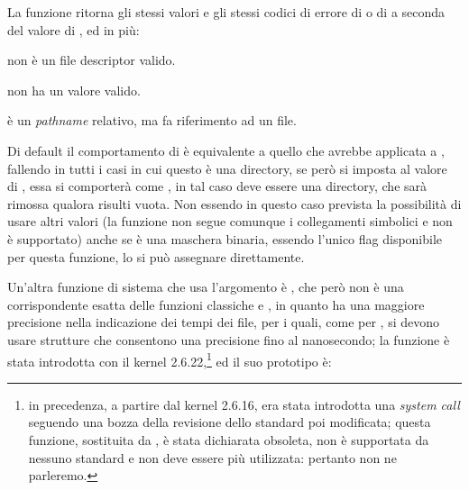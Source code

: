 \begin{funcproto}{
}

{La funzione ritorna gli stessi valori e gli stessi codici di errore di
   o di  a seconda del valore di , ed in
  più:
  \begin{errlist}
  \item[\errcode{EBADF}]  non è un file descriptor valido.
  \item[\errcode{EINVAL}]  non ha un valore valido.
  \item[\errcode{ENOTDIR}]  è un \textit{pathname} relativo,
    ma  fa riferimento ad un file.
  \end{errlist}
}  
\end{funcproto}

Di default il comportamento di  è equivalente a quello che
avrebbe  applicata a , fallendo in tutti i casi
in cui questo è una directory, se però si imposta  al valore di
, essa si comporterà come , in tal caso
 deve essere una directory, che sarà rimossa qualora risulti
vuota.  Non essendo in questo caso prevista la possibilità di usare altri
valori (la funzione non segue comunque i collegamenti simbolici e
 non è supportato) anche se  è una
maschera binaria, essendo  l'unico flag disponibile per
questa funzione, lo si può assegnare direttamente.

Un'altra funzione di sistema che usa l'argomento  è
, che però non è una corrispondente esatta delle funzioni
classiche  e , in quanto ha una maggiore precisione
nella indicazione dei tempi dei file, per i quali, come per ,
si devono usare strutture  che consentono una precisione fino
al nanosecondo; la funzione è stata introdotta con il kernel
2.6.22,\footnote{in precedenza, a partire dal kernel 2.6.16, era stata
  introdotta una \textit{system call}  seguendo una bozza
  della revisione dello standard poi modificata; questa funzione, sostituita
  da , è stata dichiarata obsoleta, non è supportata da
  nessuno standard e non deve essere più utilizzata: pertanto non ne
  parleremo.} ed il suo prototipo è:

